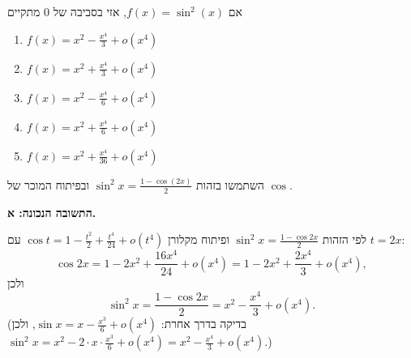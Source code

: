
\begin{question}
אם $f(x)=\sin^2(x)$, אזי בסביבה של $0$ מתקיים
\begin{enumerate}
  \item $f(x)=x^2-\frac{x^4}{3}+o(x^4)$
  \item $f(x)=x^2+\frac{x^4}{3}+o(x^4)$
  \item $f(x)=x^2-\frac{x^4}{6}+o(x^4)$
  \item $f(x)=x^2+\frac{x^4}{6}+o(x^4)$
  \item $f(x)=x^2+\frac{x^4}{36}+o(x^4)$
\end{enumerate}
\end{question}

\begin{hint}
השתמשו בזהות $\sin^2x=\frac{1-\cos(2x)}{2}$ ובפיתוח המוכר של $\cos$.
\end{hint}

\begin{solution}
\textbf{התשובה הנכונה: א.}

לפי הזהות $\sin^2x=\frac{1-\cos 2x}{2}$ ופיתוח מקלורן $\cos t=1-\frac{t^2}{2}+\frac{t^4}{24}+o(t^4)$ עם $t=2x$:
\[ \cos 2x=1-2x^2+\frac{16x^4}{24}+o(x^4)=1-2x^2+\frac{2x^4}{3}+o(x^4), \]
ולכן
\[ \sin^2x=\frac{1-\cos2x}{2}=x^2-\frac{x^4}{3}+o(x^4). \]
(בדיקה בדרך אחרת: $\sin x=x-\frac{x^3}{6}+o(x^4)$, ולכן $\sin^2x=x^2-2\cdot x\cdot\frac{x^3}{6}+o(x^4)=x^2-\frac{x^4}{3}+o(x^4)$.)
\end{solution}
